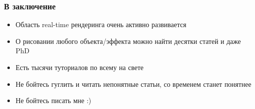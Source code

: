 \documentclass{beamer}
\begin{document}
\begin{frame}[fragile]
\frametitle{В заключение}
\begin{itemize}
\item Область real-time рендеринга очень активно развивается
\item О рисовании любого объекта/эффекта можно найти десятки статей и даже PhD
\item Есть тысячи туториалов по всему на свете
\item Не бойтесь гуглить и читать непонятные статьи, со временем станет понятнее
\item Не бойтесь писать мне :)
\end{itemize}
\end{frame}
\end{document}
